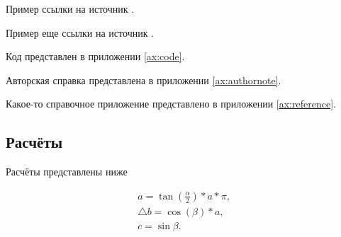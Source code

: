 Пример ссылки на источник .

Пример еще ссылки на источник .

Код представлен в приложении \ref{ax:code}.

Авторская справка представлена в приложении \ref{ax:authornote}.

Какое-то справочное приложение представлено в приложении \ref{ax:reference}.


\subsection{Расчёты}

Расчёты представлены ниже

\begin{gather}
	a = \tan(\frac{\alpha}{2})*a*\pi, \\
	\bigtriangleup b = \cos(\beta)*a, \\
	c = \sin{\beta}.
\end{gather}


\examplecommand
